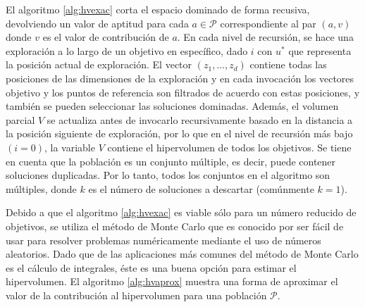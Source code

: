 El algoritmo \ref{alg:hvexac} corta el espacio dominado de forma recusiva, devolviendo un valor de 
aptitud para cada $a \in \mathcal{P}$ correspondiente al par $\left(a, v\right)$ donde $v$ es el valor de contribuci\'on de $a$. 
En cada nivel de recursi\'on, se hace una exploraci\'on a lo largo de un objetivo en espec\'ifico, dado $i$ con $u^{*}$ que 
representa la posici\'on actual de exploraci\'on. El vector $\left(z_1,\ldots, z_d \right)$ contiene todas las posiciones de las 
dimensiones de la exploraci\'on y en cada invocaci\'on los vectores objetivo y los puntos de referencia son filtrados de acuerdo 
con estas posiciones, y tambi\'en se pueden seleccionar las soluciones dominadas. Adem\'as, el volumen parcial $V$ se actualiza 
antes de invocarlo recursivamente basado en la distancia a la posici\'on siguiente de exploraci\'on, por lo que en el nivel de 
recursi\'on m\'as bajo $\left(i = 0\right)$, la variable $V$ contiene el hipervolumen de todos los objetivos. Se tiene en cuenta que 
la poblaci\'on es un conjunto m\'ultiple, es decir, puede contener soluciones \DIFaddbegin {}\DIFaddend duplicadas. Por lo tanto, todos los 
conjuntos en el algoritmo son m\'ultiples, donde $k$ es el n\'umero de soluciones a descartar (com\'unmente $k=1$).

Debido a que el algoritmo \ref{alg:hvexac} es viable s\'olo para un n\'umero reducido de objetivos, se utiliza el m\'etodo de Monte 
Carlo que es conocido por ser f\'acil de usar para resolver problemas num\'ericamente mediante el uso de n\'umeros aleatorios. Dado 
que \DIFdelbegin {}\DIFdelend \DIFaddbegin {}\DIFaddend de las aplicaciones m\'as comunes del m\'etodo de Monte Carlo es el c\'alculo de integrales, \'este es una 
buena opci\'on para estimar el hipervolumen. El algoritmo \ref{alg:hvaprox} muestra una forma de aproximar el 
valor de la contribuci\'on al hipervolumen para una poblaci\'on $\mathcal{P}$.

